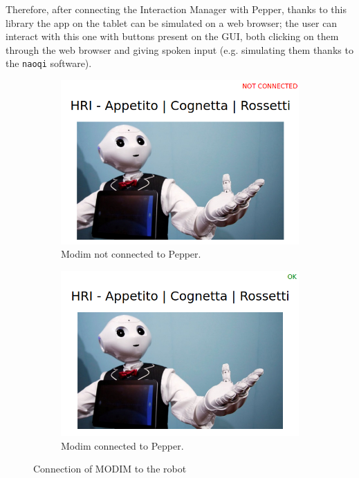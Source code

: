 \documentclass[12pt, letterpaper, twoside]{article}
\begin{document}
Therefore, after connecting the Interaction Manager with Pepper, thanks to this library the app on the tablet can be simulated on a web browser; the user can interact with this one with buttons present on the GUI, both clicking on them through the web browser and giving spoken input (e.g. simulating them thanks to the \verb|naoqi| software).

\begin{figure}[h]
	\centering
	\begin{subfigure}{.5\textwidth}
	  \centering
	  \includegraphics[width=1\linewidth]{img/modim_notok.png}
	  \caption{Modim not connected to Pepper.}
	  \label{fig:conn_notok}
	\end{subfigure}%
	\begin{subfigure}{.5\textwidth}
	  \centering
	  \includegraphics[width=1\linewidth]{img/modim_ok.png}
	  \caption{Modim connected to Pepper.}
	  \label{fig:conn_ok}
	\end{subfigure}
	\caption{Connection of MODIM to the robot}
	\label{fig:modim_connection}
\end{figure}
\end{document}
